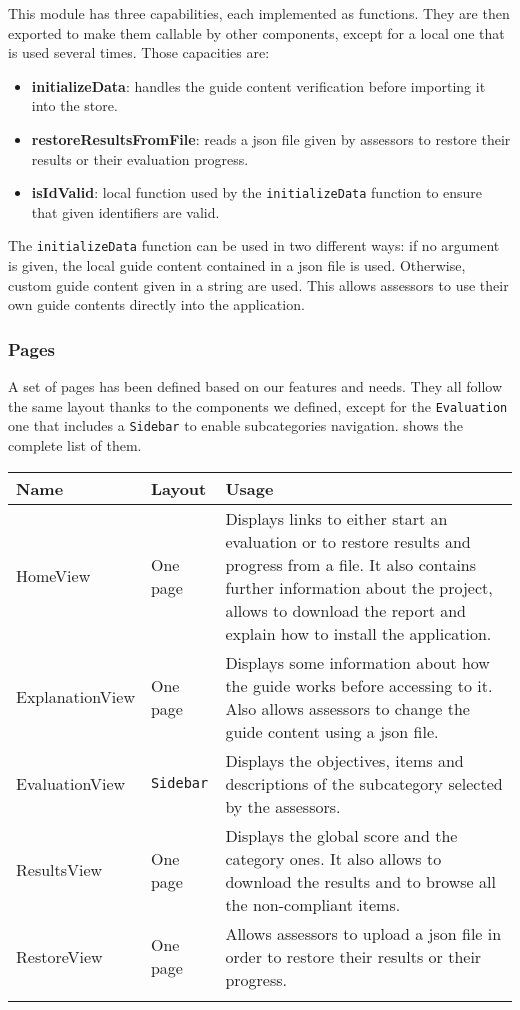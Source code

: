 This module has three capabilities, each implemented as functions. They are then exported to make them callable by other components, except for a local one that is used several times. Those capacities are:
\begin{itemize}
	\item \textbf{initializeData}: handles the guide content verification before importing it into the store.
	\item \textbf{restoreResultsFromFile}: reads a \gls{json} file given by assessors to restore their results or their evaluation progress.
	\item \textbf{isIdValid}: local function used by the \texttt{initializeData} function to ensure that given identifiers are valid.
\end{itemize}

The \texttt{initializeData} function can be used in two different ways: if no argument is given, the local guide content contained in a \gls{json} file is used. Otherwise, custom guide content given in a string are used. This allows assessors to use their own guide contents directly into the application.

\subsubsection{Pages}
\label{subsubsec:app_implementation_basics_pages}

A set of pages has been defined based on our features and needs. They all follow the same layout thanks to the components we defined, except for the \texttt{Evaluation} one that includes a \texttt{Sidebar} to enable subcategories navigation.  shows the complete list of them.

\begin{tabularx}{\textwidth}{l|lX}
	\toprule[0.8mm]
	\textbf{Name} & \textbf{Layout} & \textbf{Usage} \\
	\midrule[0.8mm]
	HomeView & One page & Displays links to either start an evaluation or to restore results and progress from a file. It also contains further information about the project, allows to download the report and explain how to install the application. \\
	\midrule
	ExplanationView & One page & Displays some information about how the guide works before accessing to it. Also allows assessors to change the guide content using a \gls{json} file. \\
	\midrule
	EvaluationView & \texttt{Sidebar} & Displays the objectives, items and descriptions of the subcategory selected by the assessors.  \\
	\midrule
	ResultsView & One page & Displays the global score and the category ones. It also allows to download the results and to browse all the non-compliant items. \\
	\midrule
	RestoreView & One page & Allows assessors to upload a \gls{json} file in order to restore their results or their progress. \\
	\bottomrule[0.8mm]
	\caption{Application pages}
	\label{table:app_implementation_pages}
\end{tabularx}


